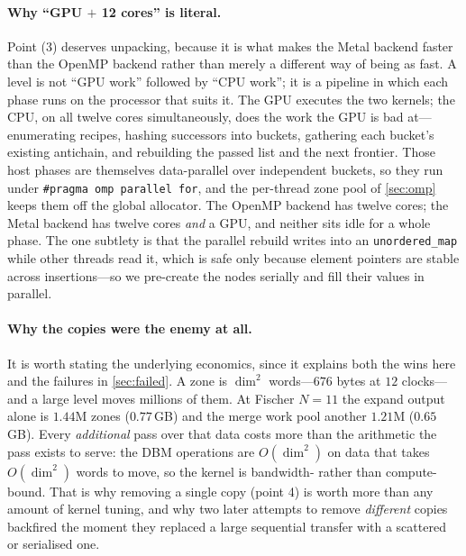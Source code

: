 \documentclass[11pt]{article}
\newcommand{\code}[1]{\texttt{\small #1}}
\begin{document}
\paragraph{Why ``GPU $+$ 12 cores'' is literal.} Point (3) deserves unpacking, because it is what makes
the Metal backend faster than the OpenMP backend rather than merely a different way of being as fast.
A level is not ``GPU work'' followed by ``CPU work''; it is a pipeline in which each phase runs on the
processor that suits it. The GPU executes the two kernels; the CPU, on all twelve cores
simultaneously, does the work the GPU is bad at---enumerating recipes, hashing successors into buckets,
gathering each bucket's existing antichain, and rebuilding the passed list and the next frontier. Those
host phases are themselves data-parallel over independent buckets, so they run under
\code{\#pragma omp parallel for}, and the per-thread zone pool of \cref{sec:omp} keeps them off the
global allocator. The OpenMP backend has twelve cores; the Metal backend has twelve cores \emph{and} a
GPU, and neither sits idle for a whole phase. The one subtlety is that the parallel rebuild writes into
an \code{unordered\_map} while other threads read it, which is safe only because element pointers are
stable across insertions---so we pre-create the nodes serially and fill their values in parallel.

\paragraph{Why the copies were the enemy at all.} It is worth stating the underlying economics, since
it explains both the wins here and the failures in \cref{sec:failed}. A zone is $\dim^2$ words---$676$
bytes at $12$ clocks---and a large level moves millions of them. At Fischer $N{=}11$ the expand output
alone is $1.44$M zones ($0.77$\,GB) and the merge work pool another $1.21$M ($0.65$\,GB). Every
\emph{additional} pass over that data costs more than the arithmetic the pass exists to serve: the DBM
operations are $O(\dim^2)$ on data that takes $O(\dim^2)$ words to move, so the kernel is bandwidth-
rather than compute-bound. That is why removing a single copy (point 4) is worth more than any amount
of kernel tuning, and why two later attempts to remove \emph{different} copies backfired the moment
they replaced a large sequential transfer with a scattered or serialised one.
\end{document}
